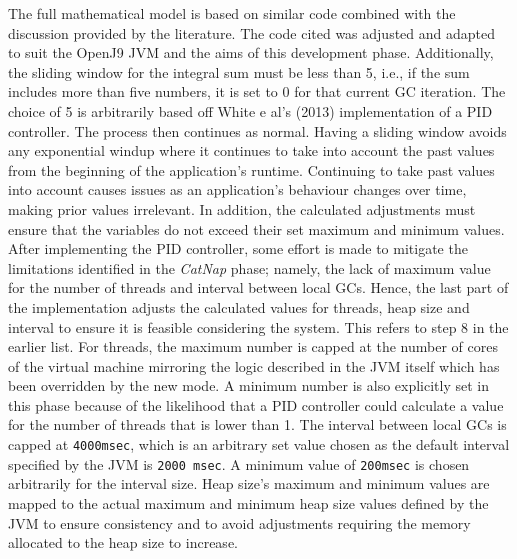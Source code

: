 \newline\newline
The full mathematical model is based on similar code
\cite{bradley219} combined with the discussion provided
by the literature. The code cited was adjusted and
adapted to suit the OpenJ9 JVM and the aims of this development phase. 
\newline\newline
Additionally, the sliding window for the integral
sum must be less than 5, i.e., if the sum includes more than five numbers,
it is set to 0 for that current GC iteration. The choice of 5 is arbitrarily based off White e al's (2013) implementation of a PID controller. The process then continues
as normal. Having a sliding window avoids any exponential windup where
it continues to take into account the past values from the beginning of
the application's runtime. Continuing to take past values into account
causes issues as an application's behaviour changes over time, making
prior values irrelevant. In addition, the calculated adjustments must ensure that the variables
do not exceed their set maximum and minimum values.
\newline\newline
After implementing the PID controller, some effort is made to mitigate the limitations identified in the \emph{CatNap} phase; namely, the lack
of maximum value for the number of threads and interval between local
GCs. Hence, the last part of the implementation adjusts the calculated
values for threads, heap size and interval to ensure it is feasible
considering the system. This refers to step 8 in the earlier list. For threads,
the maximum number is capped at the number of cores of the virtual
machine mirroring the logic described in the JVM itself which has been
overridden by the new mode. A minimum number is also explicitly set in
this phase because of the likelihood that a PID controller could
calculate a value for the number of threads that is lower than 1. The interval between
local GCs is capped at \verb|4000msec|, which is an arbitrary set value chosen
as the default interval specified by the JVM is \verb|2000 msec|. A minimum
value of \verb|200msec| is chosen arbitrarily for the interval size. Heap size's maximum and minimum
values are mapped to the actual maximum and minimum heap size values
defined by the JVM to ensure consistency and to avoid adjustments
requiring the memory allocated to the heap size to increase.

